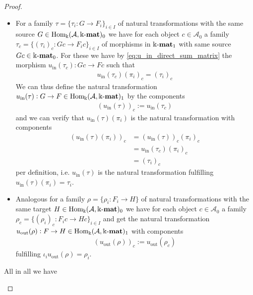 \begin{proof}
\begin{enumerate}
\begin{subproof}[Proof of (ii)]
\begin{itemize}
\item For a family $\tau = \{ \tau_{i} : G \rightarrow F_{i} \}_{i \in I}$ of natural transformations with the same source
$G \in \mathrm{Hom_{\Bbbk}}(\mathcal{A},\Bbbk\textnormal{-}\mathbf{mat})_{0}$ we have for each object $c \in \mathcal{A}_{0}$ a family
$\tau_{c} = \{ (\tau_{i})_{c} : Gc \rightarrow F_{i}c \}_{i \in I}$ of morphisms in $\Bbbk\textnormal{-}\mathbf{mat}_{1}$ with same source $Gc \in \Bbbk\textnormal{-}\mathbf{mat}_{0}$.
For these we have by \eqref{eq:u_in_direct_sum_matrix} the morphism $u_{\text{in}}(\tau_{c}) : Gc \rightarrow Fc$ such that
\begin{align*}
u_{\text{in}}(\tau_{c}) (\pi_{i})_{c} =
(\tau_{i})_{c}
\end{align*}
We can thus define the natural transformation $u_{\text{in}}(\tau) : G \rightarrow F \in \mathrm{Hom_{\Bbbk}}(\mathcal{A},\Bbbk\textnormal{-}\mathbf{mat})_{1}$ by the components
\begin{align}
(u_{\text{in}}(\tau))_{c} := u_{\text{in}}(\tau_{c})
\end{align}
and we can verify that $u_{\text{in}}(\tau) (\pi_{i})$ is the natural transformation with components
\begin{align}
(u_{\text{in}}(\tau) (\pi_{i}))_{c} &= (u_{\text{in}}(\tau))_{c} (\pi_{i})_{c} \\
&= u_{\text{in}}(\tau_{c}) (\pi_{i})_{c} \\
&= (\tau_{i})_{c}
\end{align}
per definition, i.e. $u_{\text{in}}(\tau)$ is the natural transformation fulfilling $u_{\text{in}}(\tau) (\pi_{i}) = \tau_{i}$.
\item Analogous for a family $\rho = \{ \rho_{i} : F_{i} \rightarrow H \}$ of natural transformations with the same target
$H \in \mathrm{Hom_{\Bbbk}}(\mathcal{A},\Bbbk\textnormal{-}\mathbf{mat})_{0}$ we have for each object $c \in \mathcal{A}_{0}$ a family
$\rho_{c} = \{ (\rho_{i})_{c} : F_{i} c \rightarrow Hc \}_{i \in I}$ and get the
natural transformation $u_{\text{out}}(\rho) : F \rightarrow H \in \mathrm{Hom_{\Bbbk}}(\mathcal{A},\Bbbk\textnormal{-}\mathbf{mat})_{1}$ with components
\begin{align}
(u_{\text{out}}(\rho))_{c} := u_{\text{out}}(\rho_{c})
\end{align}
fulfilling $\iota_{i} u_{\text{out}}(\rho) = \rho_{i}$.
\end{itemize}

All in all we have 


\end{subproof}
\end{enumerate}
\end{proof}
